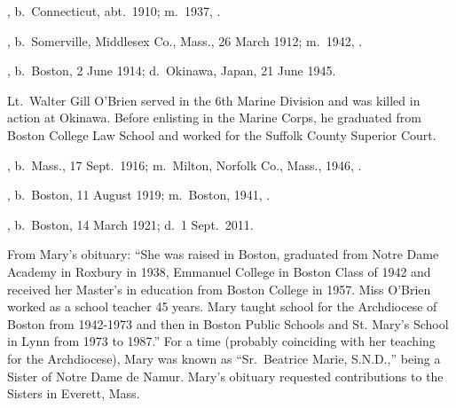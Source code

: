 \begin{Kids}
	, b.\ Connecticut, abt.\ 1910; m.\ 1937, .
	
	, b.\ Somerville, Middlesex Co., Mass., 26 March 1912; m.\ 1942, .
	
	, b.\ Boston, 2 June 1914;\cite{Walter4OBrienBirth} d.\ Okinawa, Japan, 21 June 1945.\cite{Walter4OBrienDeath}
	
	\begin{KidsMoreText}
		Lt.\ Walter Gill O'Brien served in the 6th Marine Division and was killed in action at Okinawa.\cite{Walter4OBrienDeath} Before enlisting in the Marine Corps, he graduated from Boston College Law School and worked for the Suffolk County Superior Court.\cite{Walter4OBrienPromotion}
	\end{KidsMoreText}
	
	, b.\ Mass., 17 Sept.\ 1916; m.\ Milton, Norfolk Co., Mass., 1946, .
	
	, b.\ Boston, 11 August 1919; m.\ Boston, 1941, .
	
	, b.\ Boston, 14 March 1921;\cite{Mary4OBrienBirth,Mary4OBrienBirth2} d.\ 1 Sept.\ 2011.\cite{Mary4OBrienBirth,Mary4OBrienDeath}
	
	\begin{KidsMoreText}
		From Mary's obituary: ``She was raised in Boston, graduated from Notre Dame Academy in Roxbury in 1938, Emmanuel College in Boston Class of 1942 and received her Master's in education from Boston College in 1957. Miss O'Brien worked as a school teacher 45 years. Mary taught school for the Archdiocese of Boston from 1942-1973 and then in Boston Public Schools and St. Mary's School in Lynn from 1973 to 1987.''\cite{Mary4OBrienDeath} For a time (probably coinciding with her teaching for the Archdiocese), Mary was known as ``Sr.\ Beatrice Marie, S.N.D.,'' being a Sister of Notre Dame de Namur. \cite{Epilogue,MaryGillDeath} Mary's obituary requested contributions to the Sisters in Everett, Mass.\cite{Mary4OBrienDeath}
	\end{KidsMoreText}
	
\end{Kids}